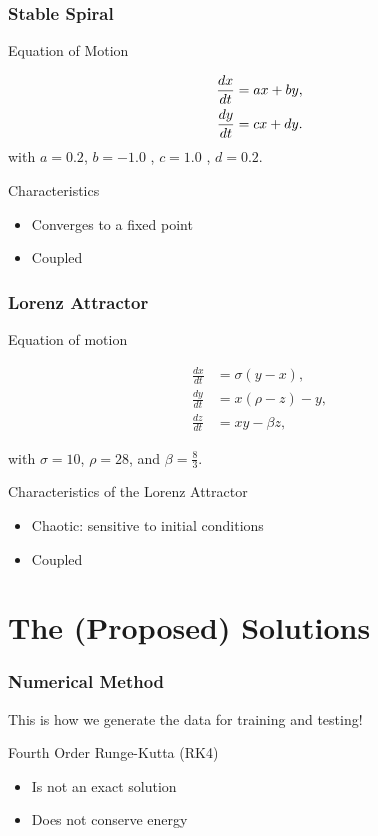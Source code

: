 \documentclass{beamer}
\begin{document}
\begin{frame}[t]
	\frametitle{Stable Spiral}
	\begin{block}{Equation of Motion}
		
\begin{equation}
	\begin{aligned}
    \frac{dx}{dt} &= ax + by \notag,\\
    \frac{dy}{dt} &= cx + dy.
    \label{eq:spiral}
	\end{aligned}
\end{equation}
with $a = 0.2$, $b = -1.0$ , $c = 1.0$ , $d = 0.2$.	
\end{block}

\begin{block}{Characteristics}
	\begin{itemize}
		\item Converges to a fixed point
		\item Coupled
	\end{itemize}
\end{block}
\end{frame}
\begin{frame}
  \frametitle{Lorenz Attractor}
\begin{block}{Equation of motion}

\begin{equation}
\label{eq:lorenz}	
\begin{aligned}
\frac{{dx}}{{dt}} &= \sigma(y - x), \\
\frac{{dy}}{{dt}} &= x(\rho - z) - y, \\
\frac{{dz}}{{dt}} &= xy - \beta z,
\end{aligned}
\end{equation}	

with \(\sigma = 10\), \(\rho = 28\), and \(\beta = \frac{8}{3}\).
\end{block}
  \begin{block}{Characteristics of the Lorenz Attractor}
	  \begin{itemize}
		  \item Chaotic: sensitive to initial conditions
		  \item Coupled
	  \end{itemize}
  	
  \end{block}
\end{frame}

\section{The (Proposed) Solutions}
\begin{frame}
	\frametitle{Numerical Method}
	This is how we generate the data for training and testing!
	\begin{block}{Fourth Order Runge-Kutta (RK4)}
		\begin{itemize}
			\item Is not an exact solution
			\item Does not conserve energy
		\end{itemize}	
	\end{block}
\end{frame}
\end{document}
